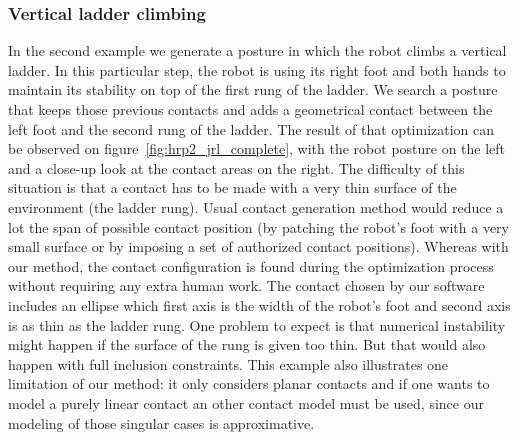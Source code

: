 \subsubsection{Vertical ladder climbing}
\label{subsubsec:ladder}

In the second example we generate a posture in which the robot climbs a vertical ladder.
In this particular step, the robot is using its right foot and both hands to maintain its stability on top of the first rung of the ladder.
We search a posture that keeps those previous contacts and adds a geometrical contact between the left foot and the second rung of the ladder.
The result of that optimization can be observed on figure~\ref{fig:hrp2_jrl_complete}, with the robot posture on the left and a close-up look at the contact areas on the right.
The difficulty of this situation is that a contact has to be made with a very thin surface of the environment (the ladder rung).
Usual contact generation method would reduce a lot the span of possible contact position (by patching the robot's foot with a very small surface or by imposing a set of authorized contact positions).
Whereas with our method, the contact configuration is found during the optimization process without requiring any extra human work.
The contact chosen by our software includes an ellipse which first axis is the width of the robot's foot and second axis is as thin as the ladder rung.
One problem to expect is that numerical instability might happen if the surface of the rung is given too thin.
But that would also happen with full inclusion constraints.
This example also illustrates one limitation of our method: it only considers planar contacts and if one wants to model a purely linear contact an other contact model must be used, since our modeling of those singular cases is approximative.


